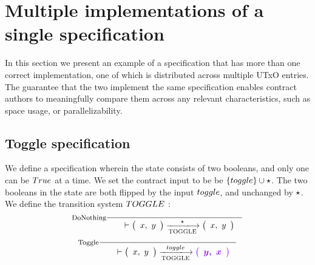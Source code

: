 \section{Multiple implementations of a single specification}
\label{sec:toggle}

In this section we present an example of a specification that has more than
one correct implementation, one of which is distributed
across multiple UTxO entries. The guarantee that the two implement the same specification
enables contract authors to meaningfully compare them across any relevant characteristics,
such as space usage, or parallelizability.

\subsection{Toggle specification}

We define a specification wherein
the state consists of two booleans, and only one can be $\true$
at a time. We set the contract input to be
be $\{\toggle \} \cup \emptytype$.
The two booleans in the state are both flipped by the input $\toggle$, and unchanged by $\star$.
We define the transition system $\TOGGLE$ :
  \begin{equation}
    \inference[DoNothing]
    { \\
    }
    {
    \begin{array}{l}
      \\
    \end{array}
      \vdash
      \left(
      \begin{array}{r}
        x, ~y
      \end{array}
      \right)
      \trans{TOGGLE}{\emptytype}
      \left(
      \begin{array}{r}
        x, ~y
      \end{array}
      \right) \\
    }
  \end{equation}
  \begin{equation}
    \inference[Toggle]
    {~\\
    }
    {
    \begin{array}{l}
      \\
    \end{array}
      \vdash
      \left(
      \begin{array}{r}
        x,~y
      \end{array}
      \right)
      \trans{TOGGLE}{toggle}
      \varUpdate{\left(
      \begin{array}{r}
        y,~x
      \end{array}
      \right) } \\
    }
  \end{equation}

